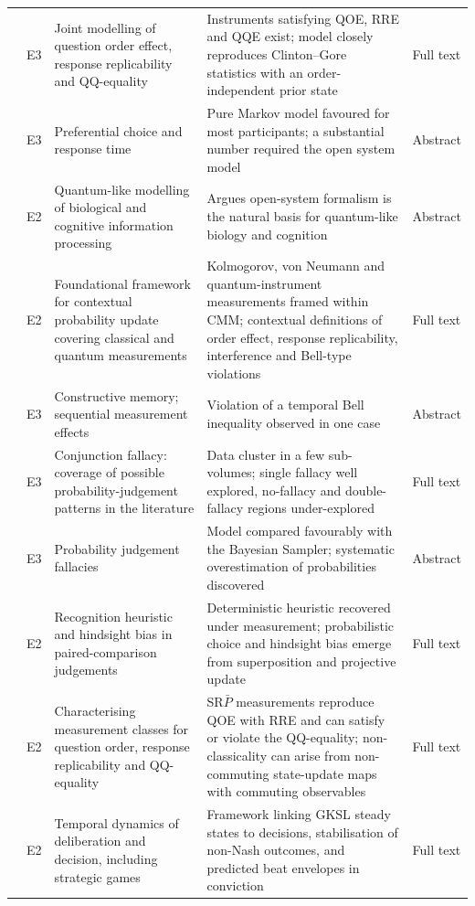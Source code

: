\documentclass[10pt,a4paper]{article}
\begin{document}
\begin{longtable}{@{}P{3.6cm}P{0.7cm}P{4.6cm}P{6.2cm}P{1.1cm}@{}}
\citet{Ozawa2021} & E3 & Joint modelling of question order effect, response replicability and QQ-equality & Instruments satisfying QOE, RRE and QQE exist; model closely reproduces Clinton--Gore statistics with an order-independent prior state & Full text \\
\citet{Epping2023} & E3 & Preferential choice and response time & Pure Markov model favoured for most participants; a substantial number required the open system model & Abstract \\
\citet{Khrennikov2023a} & E2 & Quantum-like modelling of biological and cognitive information processing & Argues open-system formalism is the natural basis for quantum-like biology and cognition & Abstract \\
\citet{Khrennikov2023b} & E2 & Foundational framework for contextual probability update covering classical and quantum measurements & Kolmogorov, von Neumann and quantum-instrument measurements framed within CMM; contextual definitions of order effect, response replicability, interference and Bell-type violations & Full text \\
\citet{Waddup2023} & E3 & Constructive memory; sequential measurement effects & Violation of a temporal Bell inequality observed in one case & Abstract \\
\citet{Veloz2024} & E3 & Conjunction fallacy: coverage of possible probability-judgement patterns in the literature & Data cluster in a few sub-volumes; single fallacy well explored, no-fallacy and double-fallacy regions under-explored & Full text \\
\citet{Huang2025a} & E3 & Probability judgement fallacies & Model compared favourably with the Bayesian Sampler; systematic overestimation of probabilities discovered & Abstract \\
\citet{Huang2025c} & E2 & Recognition heuristic and hindsight bias in paired-comparison judgements & Deterministic heuristic recovered under measurement; probabilistic choice and hindsight bias emerge from superposition and projective update & Full text \\
\citet{Fuyama2025} & E2 & Characterising measurement classes for question order, response replicability and QQ-equality & SR$\bar{P}$ measurements reproduce QOE with RRE and can satisfy or violate the QQ-equality; non-classicality can arise from non-commuting state-update maps with commuting observables & Full text \\
\citet{Asano2026} & E2 & Temporal dynamics of deliberation and decision, including strategic games & Framework linking GKSL steady states to decisions, stabilisation of non-Nash outcomes, and predicted beat envelopes in conviction & Full text \\

\end{longtable}
\end{document}
